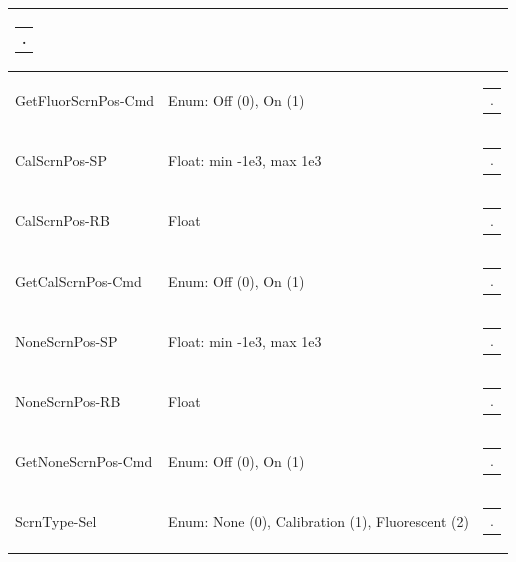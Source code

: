 \documentclass[openany]{article}
\begin{document}
\begin{longtable}{| m{4.5cm} m{2.5cm}  m{7.0cm} |}
\begin{tabular}{@{}m{6cm}@{}}
                .
            \end{tabular} \hypertarget{pv:get-fluor-scrn-pos-cmd}{}\\ \hline
        GetFluorScrnPos-Cmd & Enum: Off (0), On (1) & \begin{tabular}{@{}m{6cm}@{}}
                .
            \end{tabular} \hypertarget{pv:cal-scrn-pos}{}\\ \hline
        CalScrnPos-SP & Float: min -1e3, max 1e3 & \begin{tabular}{@{}m{6cm}@{}}
                .
            \end{tabular} \hypertarget{}{}\\ \hline
        CalScrnPos-RB & Float & \begin{tabular}{@{}m{6cm}@{}}
                .
            \end{tabular} \hypertarget{pv:get-cal-scrn-pos-cmd}{}\\ \hline
        GetCalScrnPos-Cmd & Enum: Off (0), On (1) & \begin{tabular}{@{}m{6cm}@{}}
                .
            \end{tabular} \hypertarget{pv:none-scrn-pos}{}\\ \hline
        NoneScrnPos-SP & Float: min -1e3, max 1e3 & \begin{tabular}{@{}m{6cm}@{}}
                .
            \end{tabular} \hypertarget{}{}\\ \hline
        NoneScrnPos-RB & Float & \begin{tabular}{@{}m{6cm}@{}}
                .
            \end{tabular} \hypertarget{pv:get-none-scrn-pos-cmd}{}\\ \hline
        GetNoneScrnPos-Cmd & Enum: Off (0), On (1) & \begin{tabular}{@{}m{6cm}@{}}
                .
            \end{tabular} \hypertarget{pv:scrn-type}{}\\ \hline
        ScrnType-Sel & Enum: None (0), Calibration (1), Fluorescent (2) & \begin{tabular}{@{}m{6cm}@{}}
                .
            \end{tabular} \hypertarget{}{}\\ \hline

\end{longtable}
\end{document}

